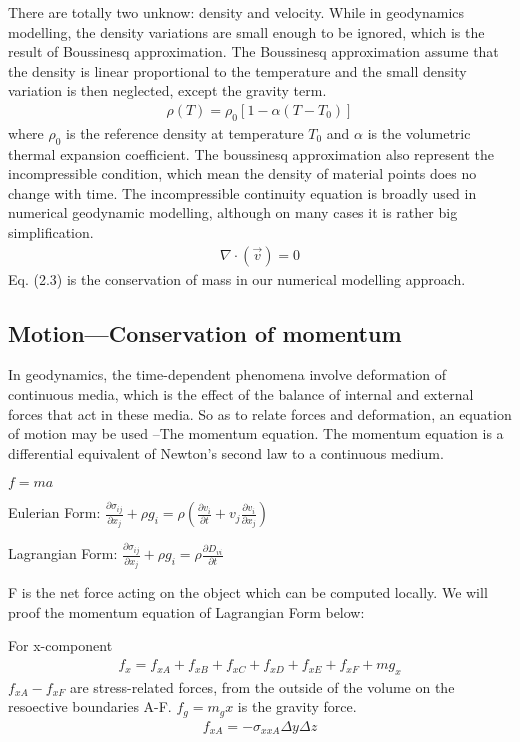 There are totally two unknow: density and velocity.
While in geodynamics modelling, the density variations are small enough to be ignored, which is the result of Boussinesq approximation. The Boussinesq approximation assume that the density is linear proportional to the temperature and the small density variation is then neglected, except the gravity term.
\begin{align}
\rho (T) = \rho_0[1-\alpha (T-T_0)] 
\end{align}
where $\rho_0$ is the reference density at temperature $T_0$ and $\alpha$ is the volumetric thermal expansion coefficient. The boussinesq approximation also represent the incompressible condition, which mean the density of material points does no change with time. The incompressible continuity equation is broadly used in numerical geodynamic modelling, although on many cases it is rather big simplification. 
\begin{align}
\nabla \cdot (\vec v) = 0 
\end{align}
Eq. (2.3) is the conservation of mass in our numerical modelling approach.

\subsection{Motion---Conservation of momentum}
In geodynamics, the time-dependent phenomena involve deformation of continuous media, which is the effect of the balance of internal and external forces that act in these media. So as to relate forces and deformation, an equation of motion may be used --The momentum equation. The momentum equation is a differential equivalent of Newton’s second law to a continuous medium.

$f=ma$

Eulerian Form: $\frac{\partial \sigma_{ij}}{\partial x_j}+\rho g_i = \rho (\frac{\partial v_i}{\partial t}+v_j\frac{\partial v_i}{\partial x_j})$

Lagrangian Form: $\frac{\partial \sigma_{ij}}{\partial x_j}+\rho g_i = \rho \frac{\partial D_{vi}}{\partial t}$

F is the net force acting on the object which can be computed locally. 
We will proof the momentum equation of Lagrangian Form below:

For x-component
\begin{align}
f_x=f_{xA}+f_{xB}+f_{xC}+f_{xD}+f_{xE}+f_{xF}+mg_x 
\end{align}
$f_{xA}- f_{xF}$ are stress-related forces, from the outside of the volume on the resoective boundaries A-F. 
$f_g=m_gx$ is the gravity force.
\begin{align}
f_{xA} = -\sigma_{xxA}\Delta y\Delta z
\end{align}
